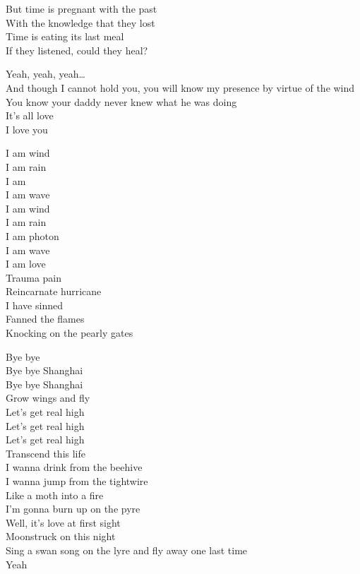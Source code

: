 But time is pregnant with the past\\
With the knowledge that they lost\\
Time is eating its last meal\\
If they listened, could they heal?\\


Yeah, yeah, yeah…\\
And though I cannot hold you, you will know my presence by virtue of the wind\\
You know your daddy never knew what he was doing\\
It's all love\\
I love you\\


I am wind\\
I am rain\\
I am \\
I am wave\\
I am wind\\
I am rain\\
I am photon\\
I am wave\\
I am love\\
Trauma pain\\
Reincarnate hurricane\\
I have sinned\\
Fanned the flames\\
Knocking on the pearly gates\\




Bye bye \\
Bye bye Shanghai\\
Bye bye Shanghai\\
Grow wings and fly\\
Let's get real high\\
Let's get real high\\
Let's get real high\\
Transcend this life\\

I wanna drink from the beehive\\
I wanna jump from the tightwire\\
Like a moth into a fire\\
I'm gonna burn up on the pyre\\
Well, it's love at first sight\\
Moonstruck on this night\\
Sing a swan song on the lyre and fly away one last time\\
Yeah\\

